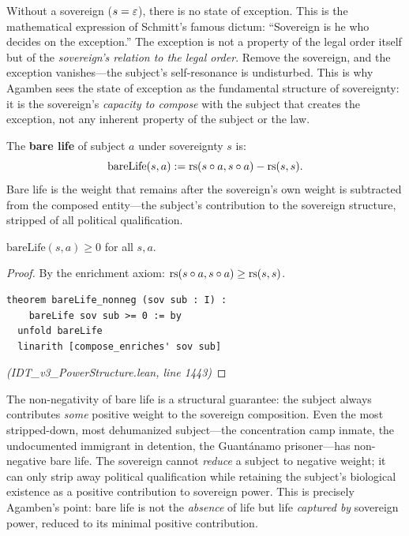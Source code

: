 \begin{interpretation}
Without a sovereign ($s = \varepsilon$), there is no state of exception. This is the
mathematical expression of Schmitt's famous dictum: ``Sovereign is he who
decides on the exception.'' The exception is not a property of the legal order
itself but of the \emph{sovereign's relation to the legal order}. Remove the
sovereign, and the exception vanishes---the subject's self-resonance is
undisturbed. This is why Agamben sees the state of exception as the fundamental
structure of sovereignty: it is the sovereign's \emph{capacity to compose}
with the subject that creates the exception, not any inherent property of the
subject or the law.
\end{interpretation}

\begin{definition}
\label{def:bare-life}
The \textbf{bare life} of subject $a$ under sovereignty $s$ is:
\[
  \mathrm{bareLife}(s, a) := \mathrm{rs}(s \circ a, s \circ a) - \mathrm{rs}(s, s).
\]
Bare life is the weight that remains after the sovereign's own weight is
subtracted from the composed entity---the subject's contribution to the
sovereign structure, stripped of all political qualification.
\end{definition}

\begin{theorem}
\label{thm:bare-life-nonneg}
$\mathrm{bareLife}(s, a) \geq 0$ for all $s, a$.
\end{theorem}

\begin{proof}
By the enrichment axiom: $\mathrm{rs}(s \circ a, s \circ a) \geq \mathrm{rs}(s,s)$.
\begin{lstlisting}
theorem bareLife_nonneg (sov sub : I) :
    bareLife sov sub >= 0 := by
  unfold bareLife
  linarith [compose_enriches' sov sub]
\end{lstlisting}
\textit{(IDT\_v3\_PowerStructure.lean, line 1443)}
\end{proof}

\begin{remark}
The non-negativity of bare life is a structural guarantee: the subject always
contributes \emph{some} positive weight to the sovereign composition. Even
the most stripped-down, most dehumanized subject---the concentration camp
inmate, the undocumented immigrant in detention, the Guantánamo prisoner---has
non-negative bare life. The sovereign cannot \emph{reduce} a subject to
negative weight; it can only strip away political qualification while
retaining the subject's biological existence as a positive contribution to
sovereign power. This is precisely Agamben's point: bare life is not the
\emph{absence} of life but life \emph{captured by} sovereign power, reduced
to its minimal positive contribution.
\end{remark}

